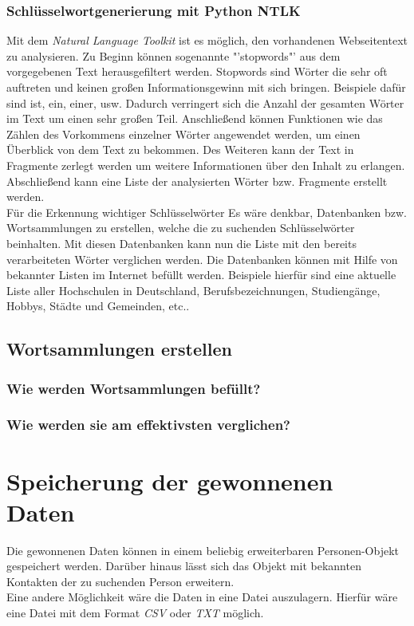 		\subsubsection{Schlüsselwortgenerierung mit Python NTLK}
		Mit dem \textit{Natural Language Toolkit} ist es möglich, den vorhandenen Webseitentext zu analysieren. Zu Beginn können sogenannte "'stopwords"' aus dem vorgegebenen Text herausgefiltert werden. Stopwords sind Wörter die sehr oft auftreten und keinen großen Informationsgewinn mit sich bringen. Beispiele dafür sind ist, ein, einer, usw. Dadurch verringert sich die Anzahl der gesamten Wörter im Text um einen sehr großen Teil. Anschließend können Funktionen wie das Zählen des Vorkommens einzelner Wörter angewendet werden, um einen Überblick von dem Text zu bekommen. Des Weiteren kann der Text in Fragmente zerlegt werden um weitere Informationen über den Inhalt zu erlangen. Abschließend kann eine Liste der analysierten Wörter bzw. Fragmente erstellt werden.\\
		Für die Erkennung wichtiger Schlüsselwörter
		Es wäre denkbar, Datenbanken bzw. Wortsammlungen zu erstellen, welche die zu suchenden Schlüsselwörter beinhalten. Mit diesen Datenbanken kann nun die Liste mit den bereits verarbeiteten Wörter verglichen werden. Die Datenbanken können mit Hilfe von bekannter Listen im Internet befüllt werden. Beispiele hierfür sind eine aktuelle Liste aller Hochschulen in Deutschland, Berufsbezeichnungen, Studiengänge, Hobbys, Städte und Gemeinden, etc..
	\subsection{Wortsammlungen erstellen}
		\subsubsection{Wie werden Wortsammlungen befüllt?}
		\subsubsection{Wie werden sie am effektivsten verglichen?}

\section{Speicherung der gewonnenen Daten}
	Die gewonnenen Daten können in einem beliebig erweiterbaren Personen-Objekt gespeichert werden. Darüber hinaus lässt sich das Objekt mit bekannten Kontakten der zu suchenden Person erweitern.\\
	Eine andere Möglichkeit wäre die Daten in eine Datei auszulagern. Hierfür wäre eine Datei mit dem Format \textit{CSV} oder \textit{TXT} möglich.